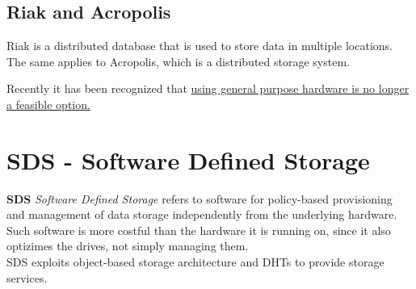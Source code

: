 \subsection*{Riak and Acropolis}
Riak is a distributed database that is used to store data in multiple locations. 
The same applies to Acropolis, which is a distributed storage system.

Recently it has been recognized that \ul{using general purpose hardware is no longer a feasible option.}

\section{SDS - Software Defined Storage}
\textbf{SDS} \textit{Software Defined Storage} refers to software for policy-based provisioning and management of data storage independently from the underlying hardware.
Such software is more costful than the hardware it is running on, since it also optizimes the drives, not simply managing them.\\
SDS exploits object-based storage architecture and DHTs to provide storage services.